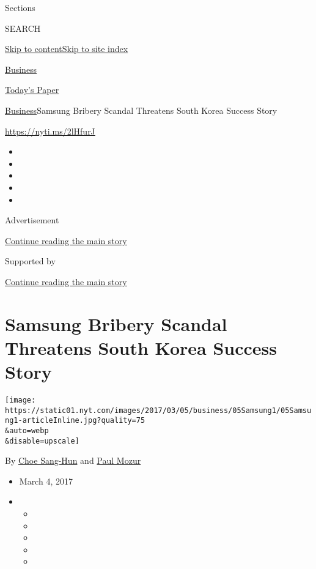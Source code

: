 Sections

SEARCH

\protect\hyperlink{site-content}{Skip to
content}\protect\hyperlink{site-index}{Skip to site index}

\href{https://www.nytimes.com/section/business}{Business}

\href{https://myaccount.nytimes.com/auth/login?response_type=cookie\&client_id=vi}{}

\href{https://www.nytimes.com/section/todayspaper}{Today's Paper}

\href{/section/business}{Business}\textbar{}Samsung Bribery Scandal
Threatens South Korea Success Story

\url{https://nyti.ms/2lHfurJ}

\begin{itemize}
\item
\item
\item
\item
\item
\end{itemize}

Advertisement

\protect\hyperlink{after-top}{Continue reading the main story}

Supported by

\protect\hyperlink{after-sponsor}{Continue reading the main story}

\hypertarget{samsung-bribery-scandal-threatens-south-korea-success-story}{%
\section{Samsung Bribery Scandal Threatens South Korea Success
Story}\label{samsung-bribery-scandal-threatens-south-korea-success-story}}

\texttt{[image: https://static01.nyt.com/images/2017/03/05/business/05Samsung1/05Samsung1-articleInline.jpg?quality=75\\\&auto=webp\\\&disable=upscale]}

By \href{http://www.nytimes.com/by/choe-sang-hun}{Choe Sang-Hun} and
\href{https://www.nytimes.com/by/paul-mozur}{Paul Mozur}

\begin{itemize}
\item
  March 4, 2017
\item
  \begin{itemize}
  \item
  \item
  \item
  \item
  \item
  \end{itemize}
\end{itemize}

